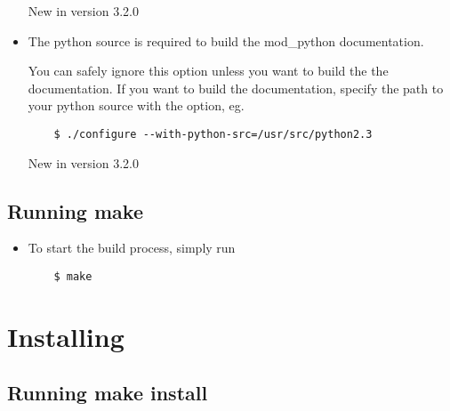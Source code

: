 \begin{itemize}
  New in version 3.2.0

\item
  The python source is required to build the mod_python documentation.

  You can safely ignore this option unless you want to build the the
  documentation. If you want to build the documentation, specify the path
  to your python source with the  option, eg.

  \begin{verbatim}
    $ ./configure --with-python-src=/usr/src/python2.3
  \end{verbatim}                      

  New in version 3.2.0

\end{itemize}

\subsection{Running make\label{inst-make}}

\begin{itemize}

\item
  To start the build process, simply run
  \begin{verbatim}
    $ make
  \end{verbatim}

\end{itemize}

\section{Installing\label{inst-installing}}

\subsection{Running make install\label{inst-makeinstall}}

